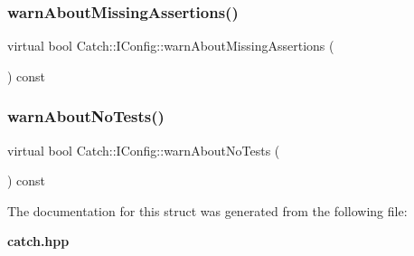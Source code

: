 \mbox{\label{struct_catch_1_1_i_config_a75d970c495a28e46b8e9b04a1d32149f}} 
\subsubsection{warnAboutMissingAssertions()}
{\footnotesize\ttfamily virtual bool Catch\+::\+I\+Config\+::warn\+About\+Missing\+Assertions (\begin{DoxyParamCaption}{ }\end{DoxyParamCaption}) const\hspace{0.3cm}{\ttfamily [pure virtual]}}

\mbox{\label{struct_catch_1_1_i_config_a30590623e3918825f2896c2262bf6fe3}} 
\subsubsection{warnAboutNoTests()}
{\footnotesize\ttfamily virtual bool Catch\+::\+I\+Config\+::warn\+About\+No\+Tests (\begin{DoxyParamCaption}{ }\end{DoxyParamCaption}) const\hspace{0.3cm}{\ttfamily [pure virtual]}}



The documentation for this struct was generated from the following file\+:\begin{DoxyCompactItemize}
\item 
\textbf{ catch.\+hpp}\end{DoxyCompactItemize}
